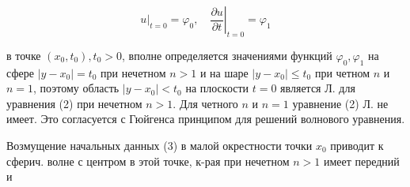 \documentclass[10pt]{article}
\begin{document}
\[

\left.u\right|_{t=0}=\varphi_{0},\left.\quad \frac{\partial u}{\partial t}\right|_{t=0}=\varphi_{1}

\]



в точке $\left(x_{0}, t_{0}\right), t_{0}>0$, вполне определяется значениями функций $\varphi_{0}, \varphi_{1}$ на сфере $\left|y-x_{0}\right|=t_{0}$ при нечетном $n>1$ и на шаре $\left|y-x_{0}\right| \leqslant t_{0}$ при четном $n$ и $n=1$, поэтому область $\left|y-x_{0}\right|<t_{0}$ на плоскости $t=0$ является Л. для уравнения (2) при нечетном $n>1$. Для четного $n$ и $n=1$ уравнение (2) Л. не имеет. Это согласуется с Гюйгенса принципом для решений волнового уравнения.



Возмущение начальных данных (3) в малой окрестности точки $x_{0}$ приводит к сферич. волне с центром в этой точке, к-рая при нечетном $n>1$ имеет передний и
\end{document}
